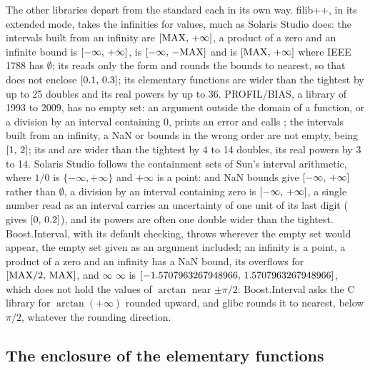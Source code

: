 \documentclass[12pt,a4paper,twoside,openright]{book}
\begin{document}
\medskip
The other libraries depart from the standard each in its own way. filib++,
in its extended mode, takes the infinities for values, much as Solaris
Studio does: the intervals built from an infinity are
$[\mathrm{MAX},\,+\infty]$, a product of a zero and an infinite bound is
$[-\infty,\,+\infty]$,  is $[-\infty,\,-\mathrm{MAX}]$
and  is $[\mathrm{MAX},\,+\infty]$ where IEEE 1788 has
$\emptyset$; its  reads only the form \code{[l, u]} and
rounds the bounds to nearest, so that \code{[0.1, 0.3]} does not enclose
$[0.1,\,0.3]$; its elementary functions are wider than the tightest by
up to 25 doubles and its real powers by up to 36. PROFIL/BIAS, a library of
1993 to 2009, has no empty set: an argument outside the domain of a
function, or a division by an interval containing 0, prints an error and
calls ; the intervals built from an infinity, a NaN or bounds
in the wrong order are not empty,  being $[1,\,2]$;
its  and  are wider than the tightest by 4 to 14
doubles, its real powers by 3 to 14. Solaris Studio follows the containment
sets of Sun's interval arithmetic, where $1/0$ is $\{-\infty, +\infty\}$ and
$+\infty$ is a point:  and NaN bounds give
$[-\infty,\,+\infty]$ rather than $\emptyset$, a division by an interval
containing zero is $[-\infty,\,+\infty]$, a single number read as an
interval carries an uncertainty of one unit of its last digit (
gives $[0,\,0.2]$), and its powers are often one double wider than the
tightest. Boost.Interval, with its default checking, throws
 wherever the empty set would appear, the empty
set given as an argument included; an infinity is a point, a product of a
zero and an infinity has a NaN bound, its  overflows for
$[\mathrm{MAX}/2,\,\mathrm{MAX}]$, and \code{atan([-}$\infty$\code{, +}%
$\infty$\code{])} is $[-1.5707963267948966,\,1.5707963267948966]$, which
does not hold the values of $\arctan$ near $\pm\pi/2$: Boost.Interval asks
the C library for $\arctan(+\infty)$ rounded upward, and glibc rounds it to
nearest, below $\pi/2$, whatever the rounding direction.

\subsection{The enclosure of the elementary functions}
\label{sec:computing-enclosure}
%
\end{document}
